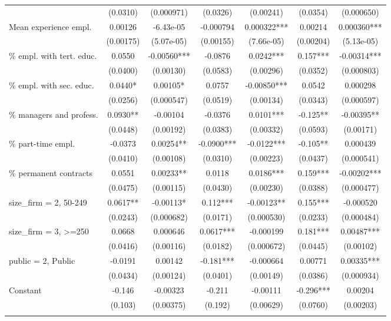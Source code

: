 \documentclass[]{article}
\begin{document}
\begin{tabular}{lcccccc}
 & (0.0310) & (0.000971) & (0.0326) & (0.00241) & (0.0354) & (0.000650) \\
Mean experience empl. & 0.00126 & -6.43e-05 & -0.000794 & 0.000322*** & 0.00214 & 0.000360*** \\
 & (0.00175) & (5.07e-05) & (0.00155) & (7.66e-05) & (0.00204) & (5.13e-05) \\
\% empl. with tert. educ. & 0.0550 & -0.00560*** & -0.0876 & 0.0242*** & 0.157*** & -0.00314*** \\
 & (0.0400) & (0.00130) & (0.0583) & (0.00296) & (0.0352) & (0.000803) \\
\% empl. with sec. educ. & 0.0440* & 0.00105* & 0.0757 & -0.00850*** & 0.0542 & 0.000298 \\
 & (0.0256) & (0.000547) & (0.0519) & (0.00134) & (0.0343) & (0.000597) \\
\% managers and profess. & 0.0930** & -0.00104 & -0.0376 & 0.0101*** & -0.125** & -0.00395** \\
 & (0.0448) & (0.00192) & (0.0383) & (0.00332) & (0.0593) & (0.00171) \\
\% part-time empl. & -0.0373 & 0.00254** & -0.0900*** & -0.0122*** & -0.105** & 0.000439 \\
 & (0.0410) & (0.00108) & (0.0310) & (0.00223) & (0.0437) & (0.000541) \\
\% permanent contracts & 0.0551 & 0.00233** & 0.0118 & 0.0186*** & 0.159*** & -0.00202*** \\
 & (0.0475) & (0.00115) & (0.0430) & (0.00230) & (0.0388) & (0.000477) \\
size\_firm = 2, 50-249 & 0.0617** & -0.00113* & 0.112*** & -0.00123** & 0.155*** & -0.000520 \\
 & (0.0243) & (0.000682) & (0.0171) & (0.000530) & (0.0233) & (0.000484) \\
size\_firm = 3, >=250 & 0.0668 & 0.000646 & 0.0617*** & -0.000199 & 0.181*** & 0.00487*** \\
 & (0.0416) & (0.00116) & (0.0182) & (0.000672) & (0.0445) & (0.00102) \\
public = 2, Public & -0.0191 & 0.00142 & -0.181*** & -0.000664 & 0.00771 & 0.00335*** \\
 & (0.0434) & (0.00124) & (0.0401) & (0.00149) & (0.0386) & (0.000934) \\
Constant & -0.146 & -0.00323 & -0.211 & -0.00111 & -0.296*** & 0.00204 \\
 & (0.103) & (0.00375) & (0.192) & (0.00629) & (0.0760) & (0.00203) \\
 &  &  &  &  &  &  \\

\end{tabular}
\end{document}
